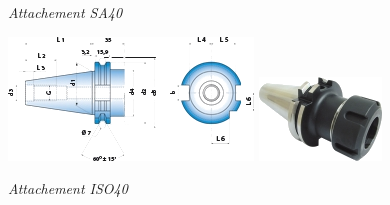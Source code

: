 \documentclass[11pt,oneside]{article}
\begin{document}
\begin{center}
\begin{minipage}[c]{.3\linewidth}
\begin{center}
\textit{Attachement SA40 \cite{attachements}}
\end{center}
\end{minipage}\hfill
\begin{minipage}[c]{.3\linewidth}
\begin{center}
\includegraphics[width=.9\textwidth]{png/cone_5}
\includegraphics[width=.5\textwidth]{png/cone_6}

\textit{Attachement ISO40 \cite{attachements}}
\end{center}
\end{minipage}
\end{center}
\end{document}
